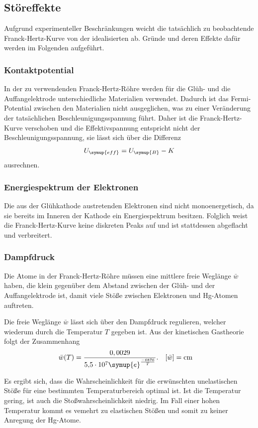\subsection{Störeffekte}
\label{sec:Störeffekte}
Aufgrund experimenteller Beschränkungen weicht die tatsächlich zu beobachtende Franck-Hertz-Kurve von der idealisierten ab. 
Gründe und deren Effekte dafür werden im Folgenden aufgeführt.

\subsubsection{Kontaktpotential}
In der zu verwendenden Franck-Hertz-Röhre werden für die Glüh- und die Auffangelektrode unterschiedliche Materialien verwendet. 
Dadurch ist das Fermi-Potential zwischen den Materialien nicht ausgeglichen, was zu einer Veränderung der tatsächlichen 
Beschleunigungsspannung führt. Daher ist die Franck-Hertz-Kurve verschoben und die Effektivspannung entspricht nicht der 
Beschleunigungsspannung, sie lässt sich über die Differenz
\begin{equation}
    U_{\symup{eff}} = U_{\symup{B}} - K
    \label{eq:Kontaktpotential}
\end{equation}
ausrechnen.

\subsubsection{Energiespektrum der Elektronen}
Die aus der Glühkathode austretenden Elektronen sind nicht monoenergetisch, da sie bereits im Inneren der Kathode ein Energiespektrum 
besitzen. Folglich weist die Franck-Hertz-Kurve keine diskreten Peaks auf und ist stattdessen abgeflacht und verbreitert.

\subsubsection{Dampfdruck}
Die Atome in der Franck-Hertz-Röhre müssen eine mittlere freie Weglänge $\bar{w}$ haben, die klein gegenüber dem Abstand zwischen 
der Glüh- und der Auffangelektrode ist, damit viele Stöße zwischen Elektronen und Hg-Atomen auftreten.

Die freie Weglänge $\bar{w}$ lässt sich über den Dampfdruck regulieren, welcher wiederum durch die Temperatur $T$ gegeben 
ist. Aus der kinetischen Gastheorie folgt der Zusammenhang
\begin{align}
    \bar{w}(T) &= \frac{0,0029}{\num{5.5e7} \symup{e}^{\frac{-6876}{T}}}. & [\bar{w}] &= \unit{\centi\metre} \label{eq:freie weglänge} %
\end{align}

Es ergibt sich, dass die Wahrscheinlichkeit für die erwünschten unelastischen Stöße für eine bestimmten Temperaturbereich optimal ist. Ist 
die Temperatur gering, ist auch die Stoßwahrscheinlichkeit niedrig. Im Fall einer hohen Temperatur kommt es vemehrt zu elastischen Stößen 
und somit zu keiner Anregung der Hg-Atome.